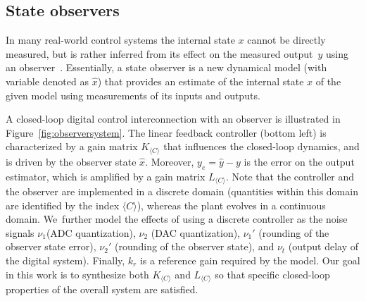 \documentclass[sigconf]{llncs}
\newcommand{\mat}[1]{{#1}}
\renewcommand{\vec}[1]{{#1}}
\begin{document}
\subsection{State observers}\label{sec:observer}

In many real-world control systems the internal state $x$ cannot be directly
measured, but is rather inferred from its effect on the measured
output~$\vec{y}$ using an observer~\cite{Astrom08}.  Essentially, a state
observer is a new dynamical model (with variable denoted as $\hat{\vec{x}}$)
that provides an estimate of the internal state $x$ of the given model using
measurements of its inputs and outputs.

A closed-loop digital control interconnection with an observer is
illustrated in Figure~\ref{fig:observersystem}.  The linear feedback
controller (bottom left) is characterized by a gain matrix $\mat{K}_{\langle
C \rangle}$ that influences the closed-loop dynamics, and is driven by the
observer state $\hat{\vec{x}}$.  Moreover, $\vec{y}_e=\hat{\vec{y}} -
\vec{y}$ is the error on the output estimator,
%
%
which is amplified by a gain matrix $\mat{L}_{\langle C \rangle}$.  Note
that the controller and the observer are implemented in a discrete domain
(quantities within this domain are identified by the index $\langle C
\rangle$), whereas the plant evolves in a continuous domain.  We~further
model the effects of using a discrete controller as the noise signals
$\nu_1$(ADC quantization), $\nu_2$ (DAC quantization), $\nu_1'$ (rounding of
the observer state error), $\nu_2'$ (rounding of the observer state), and
$\nu_t$ (output delay of the digital system).  Finally, $k_r$ is a reference
gain required by the model.  Our goal in this work is to synthesize both
$\mat{K}_{\langle C \rangle}$ and $\mat{L}_{\langle C \rangle}$ so that
specific closed-loop properties of the overall system are
satisfied.
 
\end{document}
